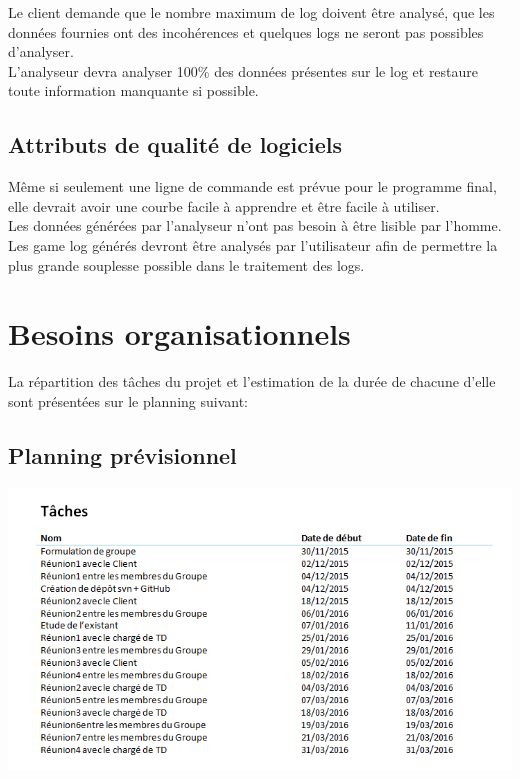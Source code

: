 \documentclass{scrreprt}
\begin{document}
Le client demande que le nombre maximum de log doivent être analysé, que les données fournies ont des incohérences et quelques logs ne seront pas possibles d'analyser.\\
L'analyseur devra analyser 100\% des données présentes sur le log et restaure toute information manquante si possible.\\
\section{Attributs de qualité de logiciels}

Même si seulement une ligne de commande est prévue pour le programme final, elle devrait avoir une courbe facile à apprendre et être facile à utiliser.\\
Les données générées par l'analyseur n’ont pas besoin à être lisible par l'homme.\\
Les game log générés devront être analysés par l'utilisateur afin de permettre la plus grande souplesse possible dans le traitement des logs.

\chapter{Besoins organisationnels}

La répartition des tâches du projet et l'estimation de la durée de chacune d'elle sont présentées sur le planning suivant:\\

\section{Planning prévisionnel}

\includegraphics[scale=0.45,keepaspectratio]{planning}\\
\end{document}
